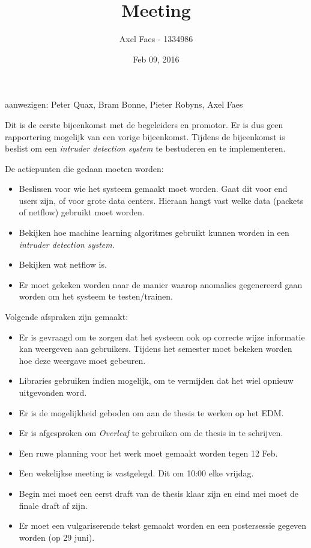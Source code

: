 \documentclass[notitlepage]{article}
\title{Meeting}
\author{Axel Faes - 1334986}
\date{Feb 09, 2016}
\begin{document}
\maketitle

aanwezigen: Peter Quax, Bram Bonne, Pieter Robyns, Axel Faes

Dit is de eerste bijeenkomst met de begeleiders en promotor. Er is dus geen rapportering mogelijk van een vorige bijeenkomst. Tijdens de bijeenkomst is beslist om een \textit{intruder detection system} te bestuderen en te implementeren. 

De actiepunten die gedaan moeten worden:
\begin{itemize}  
        \item Beslissen voor wie het systeem gemaakt moet worden. Gaat dit voor end users zijn, of voor grote data centers. Hieraan hangt vast welke data (packets of netflow) gebruikt moet worden.
        \item Bekijken hoe machine learning algoritmes gebruikt kunnen worden in een \textit{intruder detection system}.
        \item Bekijken wat netflow is.
        \item Er moet gekeken worden naar de manier waarop anomalies gegenereerd gaan worden om het systeem te testen/trainen.
\end{itemize}

Volgende afspraken zijn gemaakt:
\begin{itemize}  
		\item Er is gevraagd om te zorgen dat het systeem ook op correcte wijze informatie kan weergeven aan gebruikers. Tijdens het semester moet bekeken worden hoe deze weergave moet gebeuren.
        \item Libraries gebruiken indien mogelijk, om te vermijden dat het wiel opnieuw uitgevonden word.
        \item Er is de mogelijkheid geboden om aan de thesis te werken op het EDM.
        \item Er is afgesproken om \textit{Overleaf} te gebruiken om de thesis in te schrijven.
        \item Een ruwe planning voor het werk moet gemaakt worden tegen 12 Feb.
        \item Een wekelijkse meeting is vastgelegd. Dit om 10:00 elke vrijdag.
        \item Begin mei moet een eerst draft van de thesis klaar zijn en eind mei moet de finale draft af zijn. 
        \item Er moet een vulgariserende tekst gemaakt worden en een postersessie gegeven worden (op 29 juni).
\end{itemize}
\end{document}
